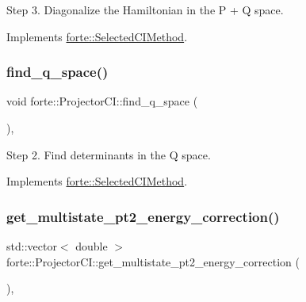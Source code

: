 Step 3. Diagonalize the Hamiltonian in the P + Q space. 



Implements \mbox{\hyperlink{classforte_1_1_selected_c_i_method_a9f01588d22401cd2631a09940ea7db50}{forte\+::\+Selected\+C\+I\+Method}}.

\mbox{\label{classforte_1_1_projector_c_i_a8818efb18539867d404b98e13b0a7390}} 
\subsubsection{\texorpdfstring{find\+\_\+q\+\_\+space()}{find\_q\_space()}}
{\footnotesize\ttfamily void forte\+::\+Projector\+C\+I\+::find\+\_\+q\+\_\+space (\begin{DoxyParamCaption}{ }\end{DoxyParamCaption})\hspace{0.3cm}{\ttfamily [override]}, {\ttfamily [virtual]}}



Step 2. Find determinants in the Q space. 



Implements \mbox{\hyperlink{classforte_1_1_selected_c_i_method_aff521efa08edfafb479f32e03a70c118}{forte\+::\+Selected\+C\+I\+Method}}.

\mbox{\label{classforte_1_1_projector_c_i_aa812688cd77719876ea535f49b835c57}} 
\subsubsection{\texorpdfstring{get\+\_\+multistate\+\_\+pt2\+\_\+energy\+\_\+correction()}{get\_multistate\_pt2\_energy\_correction()}}
{\footnotesize\ttfamily std\+::vector$<$ double $>$ forte\+::\+Projector\+C\+I\+::get\+\_\+multistate\+\_\+pt2\+\_\+energy\+\_\+correction (\begin{DoxyParamCaption}{ }\end{DoxyParamCaption})\hspace{0.3cm}{\ttfamily [override]}, {\ttfamily [virtual]}}



